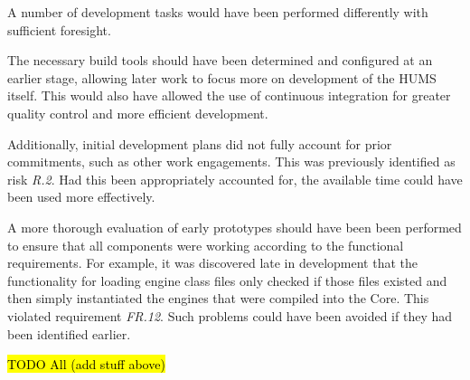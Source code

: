 \documentclass[10pt,a4paper]{article}
\begin{document}
A number of development tasks would have been performed differently with sufficient foresight.

The necessary build tools should have been determined and configured at an earlier stage, allowing later work to focus more on development of the HUMS itself. This would also have allowed the use of continuous integration for greater quality control and more efficient development.

Additionally, initial development plans did not fully account for prior commitments, such as other work engagements. This was previously identified as risk \emph{R.2}. Had this been appropriately accounted for, the available time could have been used more effectively.

A more thorough evaluation of early prototypes should have been been performed to ensure that all components were working according to the functional requirements. For example, it was discovered late in development that the functionality for loading engine class files only checked if those files existed and then simply instantiated the engines that were compiled into the Core. This violated requirement \emph{FR.12}. Such problems could have been avoided if they had been identified earlier.

\hl{TODO All (add stuff above)}


\clearpage



\end{document}
